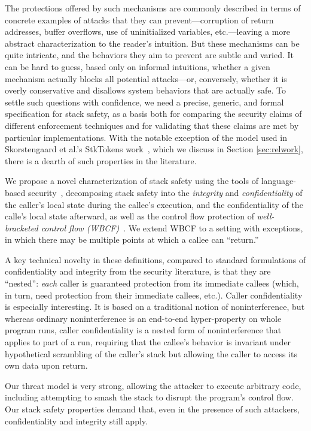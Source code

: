 \documentclass[10pt,conference]{ieeetran}%
\theoremstyle{definition}
\begin{document}
The protections offered by such mechanisms are commonly described in terms
of concrete examples of attacks that they can prevent---corruption of return
addresses, buffer overflows, use of uninitialized variables, etc.---leaving
a more abstract characterization to the reader's intuition.  But these
mechanisms can be quite intricate, and the behaviors they aim to prevent are
subtle and varied. It can be hard to guess, based only on informal
intuitions, whether a given mechanism actually blocks all potential
attacks---or, conversely, whether it is overly conservative and disallows
system behaviors that are actually safe.
To settle such questions with confidence,
we need a precise, generic, and formal specification for stack
safety, as a basis both for comparing the security claims of different
enforcement techniques and for validating that these claims
are met by particular implementations. With the notable exception of the model used
in Skorstengaard et al.'s StkTokens work~\cite{SkorstengaardSTKJFP}, which we
discuss in Section \ref{sec:relwork}, there is a dearth of such properties in
the literature.

We propose a novel characterization of stack safety using the tools of language-based
security~\cite{sabelfeld2003language}, decomposing stack safety into
the {\em integrity} and {\em confidentiality} of the caller’s local state
during the callee's execution, and the confidentiality of the calle's local state
afterward, as well as the control flow protection of {\em well-bracketed control
  flow (WBCF)}~\cite{SkorstengaardSTKJFP}. We extend WBCF to a setting with exceptions,
in which there may be multiple points at which a callee can ``return.''

A key technical novelty in these definitions,
compared to standard formulations of confidentiality and integrity from the
security literature, is that they
are ``nested'': {\em each} caller is guaranteed protection from its
immediate callees (which, in turn, need protection from their immediate
callees, etc.).
Caller confidentiality is especially interesting. It is based on a traditional
notion of noninterference, but whereas ordinary noninterference
is an end-to-end hyper-property on whole program runs, caller
confidentiality is a nested form of noninterference that applies to
part of a run, requiring that the callee’s behavior is
invariant under hypothetical scrambling of the caller’s stack
but allowing the caller to access its own data upon return.

Our threat model is very strong, allowing the attacker
to execute arbitrary code, including attempting to smash
the stack to disrupt the program’s control flow. Our stack safety
properties demand that, even in the presence of such attackers, confidentiality
and integrity still apply.
%
\end{document}
